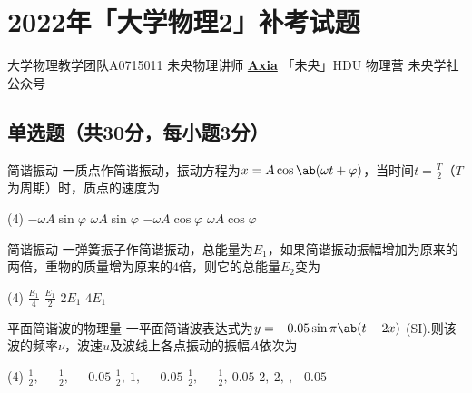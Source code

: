 \chapter{2022年「大学物理2」\hdu 补考试题}
\date{2023年3月14日}{大学物理教学团队}{A0715011}
{未央物理讲师 \href{https://qm.qq.com/q/UPbGudx8cK}{\textbf{Axia}}}
{}{「未央」HDU 物理营}
{}{未央学社公众号}
% 
\section{单选题（共30分，每小题3分）}
{
\begin{choice}[B]{简谐振动}
    一质点作简谐振动，振动方程为$x=A\cos{\ab(\omega t+\varphi)}$，当时间$t=\frac{T}{2}$（$T$为周期）时，质点的速度为
    \begin{tasks}(4)
        \task $-\omega A\sin{\varphi}$
        \task $\omega A\sin{\varphi}$
        \task $-\omega A\cos{\varphi}$
        \task $\omega A\cos{\varphi}$
    \end{tasks}
\end{choice}

\begin{choice}[D]{简谐振动}
    一弹簧振子作简谐振动，总能量为$E_1$，如果简谐振动振幅增加为原来的两倍，重物的质量增为原来的$4$倍，则它的总能量$E_2$变为
    \begin{tasks}(4)
        \task $\frac{E_1}{4}$
        \task $\frac{E_1}{2}$
        \task $2E_1$
        \task $4E_1$
    \end{tasks}
\end{choice}

\begin{choice}[C]{平面简谐波的物理量}
    一平面简谐波表达式为$y=-0.05\sin{\pi\ab(t-2x)}$ (SI).则该波的频率$\nu$，波速$u$及波线上各点振动的振幅$A$依次为
    \begin{tasks}(4)
        \task $\frac{1}{2},\ -\frac{1}{2},\ -0.05$
        \task $\frac{1}{2},\ 1,\ -0.05$
        \task $\frac{1}{2},\ -\frac{1}{2},\ 0.05$
        \task $2,\ 2,\ ,-0.05$
    \end{tasks}
\end{choice}

}
